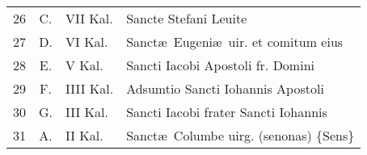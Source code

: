 \documentclass[a5paper,10pt]{book}
\begin{document}
\begin{center}
\begin{tabular}{r c l l}
26 & \color{Red} C. & VII Kal. & Sancte Stefani Leuite \\
27 & \color{Red} D. & VI Kal. & Sanct\ae \ Eugeni\ae \ uir. et comitum eius \\
28 & \color{Red} E. & V Kal. & Sancti Iacobi Apostoli fr. Domini \\
29 & \color{Red} F. & IIII Kal. & Adsumtio Sancti Iohannis Apostoli \\
30 & \color{Red} G. & III Kal. & Sancti Iacobi frater Sancti Iohannis \\
31 & \color{Red} A. & II Kal. & Sanct\ae \ Columbe uirg. (senonas) \{Sens\} \\
\end{tabular}
\end{center}
\end{document}
